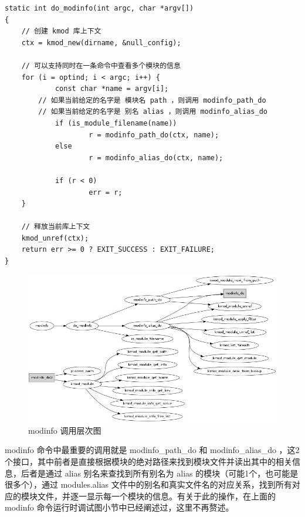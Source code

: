 \documentclass[11pt,a4paper]{article}
\makeatletter
\def\maxwidth{\ifdim\Gin@nat@width>\linewidth\linewidth
\else\Gin@nat@width\fi}
\let\Oldincludegraphics\includegraphics
\renewcommand{\includegraphics}[1]{\Oldincludegraphics[width=\maxwidth]{#1}}
\makeatother
\begin{document}
{\begin{shaded}\begin{verbatim}
static int do_modinfo(int argc, char *argv[])
{
    // 创建 kmod 库上下文
    ctx = kmod_new(dirname, &null_config);

    // 可以支持同时在一条命令中查看多个模块的信息
    for (i = optind; i < argc; i++) {
            const char *name = argv[i];
        // 如果当前给定的名字是 模块名 path ，则调用 modinfo_path_do
        // 如果当前给定的名字是 别名 alias ，则调用 modinfo_alias_do
            if (is_module_filename(name))
                    r = modinfo_path_do(ctx, name);
            else 
                    r = modinfo_alias_do(ctx, name);

            if (r < 0)
                    err = r;
    }   

    // 释放当前库上下文
    kmod_unref(ctx);
    return err >= 0 ? EXIT_SUCCESS : EXIT_FAILURE;
}
\end{verbatim}\end{shaded}}
\begin{figure}[htbp]
\centering
\includegraphics{./figures/modinfo.jpg}
\caption{modinfo 调用层次图}
\end{figure}

modinfo 命令中最重要的调用就是 modinfo\_path\_do 和 modinfo\_alias\_do
，这2个接口，其中前者是直接根据模块的绝对路径来找到模块文件并读出其中的相关信息，后者是通过
alias 别名来查找到所有别名为 alias 的模块（可能1个，也可能是很多个），通过
modules.alias
文件中的别名和真实文件名的对应关系，找到所有对应的模块文件，并逐一显示每一个模块的信息。有关于此的操作，在上面的
modinfo 命令运行时调试图小节中已经阐述过，这里不再赘述。
\end{document}
